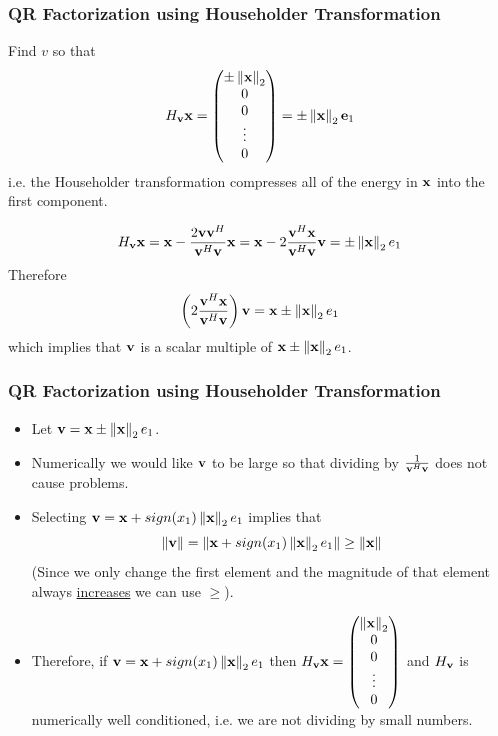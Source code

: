 \documentclass{beamer}
\begin{document}
\begin{frame}\frametitle{QR Factorization using Householder Transformation}
	Find $v$ so that
	\[ 
		H_{\mathbf{v}}\mathbf{x} = \begin{pmatrix} \pm \left\|\mathbf{x}\right\|_2\\0\\0\\\vdots\\0\end{pmatrix} = \pm \left\|\mathbf{x}\right\|_2 \mathbf{e}_1
	\]
	i.e. the Householder transformation compresses all of the energy in $\mathbf{x}$ into the first component.
	
	\[ 
		H_{\mathbf{v}} \mathbf{x} = \mathbf{x} - \frac{2\mathbf{v}\mathbf{v}^H}{\mathbf{v}^H\mathbf{v}}\mathbf{x} = \mathbf{x} - 2\frac{\mathbf{v}^H\mathbf{x}}{\mathbf{v}^H\mathbf{v}}\mathbf{v} = \pm\left\|\mathbf{x}\right\|_2e_1 
	\]
	Therefore
	\[
		\left(2\frac{\mathbf{v}^H\mathbf{x}}{\mathbf{v}^H\mathbf{v}}\right)\mathbf{v} = \mathbf{x} \pm \left\|\mathbf{x}\right\|_2e_1
	\]
	which implies that $\mathbf{v}$ is a scalar multiple of $\mathbf{x} \pm \left\|\mathbf{x}\right\|_2e_1$.
\end{frame}
	
\begin{frame}\frametitle{QR Factorization using Householder Transformation}
	\begin{itemize}
		\item 	Let $\mathbf{v} = \mathbf{x} \pm \left\|\mathbf{x}\right\|_2e_1$.
		\item Numerically we would like $\mathbf{v}$ to be large so that dividing by $\frac{1}{\mathbf{v}^H\mathbf{v}}$ does not cause problems.
		\item Selecting $\mathbf{v} = \mathbf{x} + sign(x_1)\left\|\mathbf{x}\right\|_2e_1$ implies that
				\[ 
					\left\|\mathbf{v}\right\| 
						= \left\|\mathbf{x} + sign(x_1)\left\|\mathbf{x}\right\|_2e_1 \right\| 
						\geq \left\|\mathbf{x}\right\| 
				\]
			(Since we only change the first element and the magnitude of that element always \underline{increases} we can use $\geq$).
		\item Therefore, if $\mathbf{v} = \mathbf{x} + sign(x_1)\left\|\mathbf{x}\right\|_2e_1$ then $H_{\mathbf{v}}\mathbf{x} = \begin{pmatrix} \left\|\mathbf{x}\right\|_2\\0\\0\\\vdots\\0\end{pmatrix}$ and $H_{\mathbf{v}}$ is numerically well conditioned, i.e. we are not dividing by small numbers.
	\end{itemize}
\end{frame}
\end{document}
